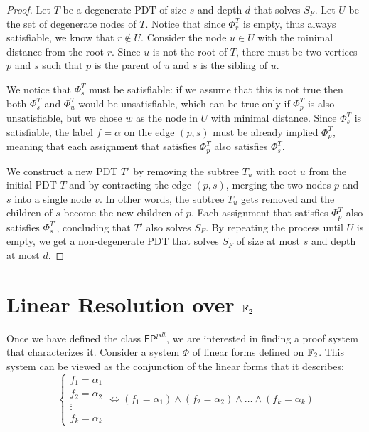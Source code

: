 \begin{proof}
    
 Let $T$ be a degenerate PDT of size $s$ and depth $d$ that solves $S_F$. Let $U$ be the set of degenerate nodes of $T$. Notice that since $\Phi_r^T$ is empty, thus always satisfiable, we know that $r \notin U$. Consider the node $u \in U$ with the minimal distance from the root $r$. Since $u$ is not the root of $T$, there must be two vertices $p$ and $s$ such that $p$ is the parent of $u$ and $s$ is the sibling of $u$.

 We notice that $\Phi_s^T$ must be satisfiable: if we assume that this is not true then both $\Phi_s^T$ and $\Phi_u^T$ would be unsatisfiable, which can be true only if $\Phi_p^T$ is also unsatisfiable, but we chose $w$ as the node in $U$ with minimal distance. Since $\Phi_s^T$ is satisfiable, the label $f = \alpha$ on the edge $(p,s)$ must be already implied $\Phi_p^T$, meaning that each assignment that satisfies $\Phi_p^T$ also satisfies $\Phi_s^T$.

 We construct a new PDT $T'$ by removing the subtree $T_u$ with root $u$ from the initial PDT $T$ and by contracting the edge $(p,s)$, merging the two nodes $p$ and $s$ into a single node $v$. In other words, the subtree $T_u$ gets removed and the children of $s$ become the new children of $p$. Each assignment that satisfies $\Phi_p^T$ also satisfies $\Phi_s^{T'}$, concluding that $T'$ also solves $S_F$. By repeating the process until $U$ is empty, we get a non-degenerate PDT that solves $S_F$ of size at most $s$ and depth at most $d$.
\end{proof}

\section{Linear Resolution over $\mathbb{F}_2$}

Once we have defined the class $\mathsf{FP}^{pdt}$, we are interested in finding a proof system that characterizes it. Consider a system $\Phi$ of linear forms defined on $\mathbb{F}_2$. This system can be viewed as the conjunction of the linear forms that it describes:
\[\left \{ \begin{array}{c}
 f_1 = \alpha_1 \\
 f_2 = \alpha_2 \\
    \vdots \\
 f_k = \alpha_k
\end{array}\right . \iff (f_1 = \alpha_1) \land (f_2 = \alpha_2) \land \ldots \land (f_k = \alpha_k)\]

